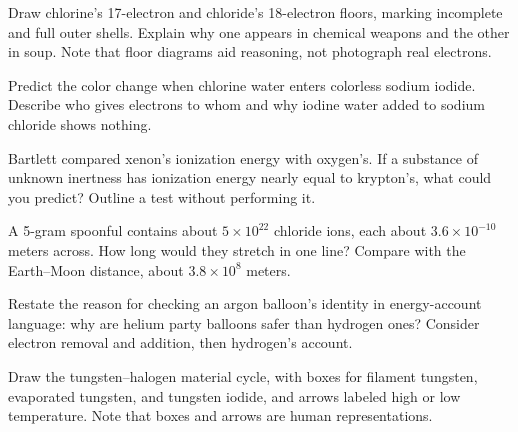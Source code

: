 \begin{sikaoti}
\item Draw chlorine's 17-electron and chloride's 18-electron floors, marking incomplete and full outer shells. Explain why one appears in chemical weapons and the other in soup. Note that floor diagrams aid reasoning, not photograph real electrons.
\item Predict the color change when chlorine water enters colorless sodium iodide. Describe who gives electrons to whom and why iodine water added to sodium chloride shows nothing.
\item Bartlett compared xenon's ionization energy with oxygen's. If a substance of unknown inertness has ionization energy nearly equal to krypton's, what could you predict? Outline a test without performing it.
\item A 5-gram spoonful contains about $5\times 10^{22}$ chloride ions, each about $3.6\times 10^{-10}$ meters across. How long would they stretch in one line? Compare with the Earth--Moon distance, about $3.8\times 10^{8}$ meters.
\item Restate the reason for checking an argon balloon's identity in energy-account language: why are helium party balloons safer than hydrogen ones? Consider electron removal and addition, then hydrogen's account.
\item Draw the tungsten--halogen material cycle, with boxes for filament tungsten, evaporated tungsten, and tungsten iodide, and arrows labeled high or low temperature. Note that boxes and arrows are human representations.
\end{sikaoti}
